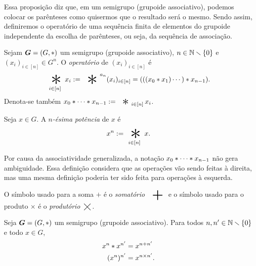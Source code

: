 Essa proposição diz que, em um semigrupo (grupoide associativo), podemos colocar os parênteses como quisermos que o resultado será o mesmo. Sendo assim, definiremos o operatório de uma sequência finita de elementos do grupoide independente da escolha de parênteses, ou seja, da sequência de associação.

\begin{definition}
Sejam $\bm G=(G,\ast)$ um semigrupo (grupoide associativo), $n \in \mathbb{N} \smallsetminus \{0\}$ e $(x_i)_{i \in [n]} \in G^n$. O \emph{operatório} de $(x_i)_{i \in [n]}$ é%
	\begin{equation*}
	\bigopb _{i \in [n]} x_i := \bigopb\nolimits^{a_n} (x_i)_{i \in [n]} = (((x_0 \opb x_1) \cdots ) \opb x_{n-1}).
	\end{equation*}
Denota-se também $x_0 \opb \cdots \opb x_{n-1} := \bigopb _{i \in [n]} x_i$.

Seja $x \in G$. A \emph{$n$-ésima potência} de $x$ é
	\begin{equation*}
	x^n := \bigopb _{i \in [n]} x.
	\end{equation*}
\end{definition}

Por causa da associatividade generalizada, a notação $x_0 \ast \cdots \ast x_{n-1}$ não gera ambiguidade. Essa definição considera que as operações vão sendo feitas à direita, mas uma mesma definição poderia ter sido feita para operações à esquerda.%

O símbolo usado para a soma $+$ é o \emph{somatório} $\displaystyle\bigplus$ e o símbolo usado para o produto $\times$ é o \emph{produtório} $\displaystyle\bigtimes$.

\begin{exercise}
Seja $\bm G=(G,\ast)$ um semigrupo (grupoide associativo). Para todos $n,n' \in \mathbb{N} \smallsetminus \{0\}$ e todo $x \in G$,
	\begin{align*}
	x^{n} \ast x^{n'} &= x^{n+n'} \\
	(x^n)^{n'} &= x^{n \times n'}.
	\end{align*}
\end{exercise}

